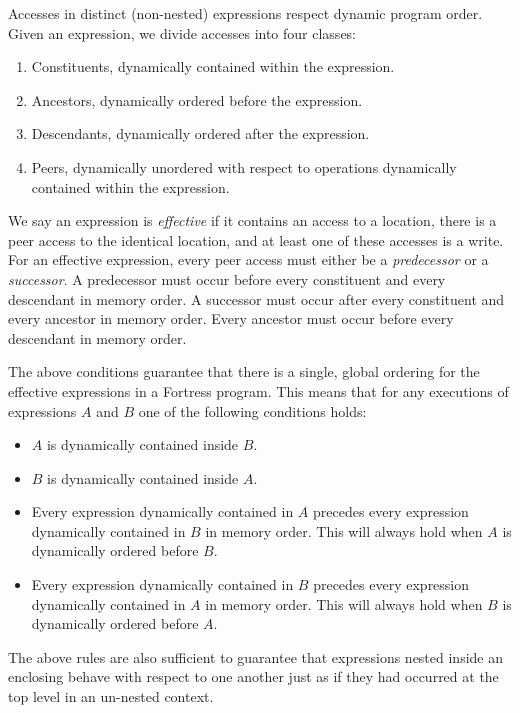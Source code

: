 Accesses in distinct (non-nested)  expressions respect
dynamic program order.  Given an  expression, we divide
accesses into four classes:
\begin{enumerate}
\item Constituents, dynamically contained within the  expression.
\item Ancestors, dynamically ordered before the  expression.
\item Descendants, dynamically ordered after the  expression.
\item Peers, dynamically unordered with respect to operations
  dynamically contained within the  expression.
\end{enumerate}
We say an  expression is \emph{effective} if it contains
an access to a location, there is a peer access to the identical
location, and at least one of these accesses is a write.  For an
effective  expression, every peer access must either be
a \emph{predecessor} or a \emph{successor}.  A predecessor must occur
before every constituent and every descendant in memory order.  A
successor must occur after every constituent and every ancestor in
memory order.  Every ancestor must occur before every descendant in
memory order.

The above conditions guarantee that there is a single, global ordering
for the effective  expressions in a Fortress program.  This
means that for any executions of  expressions $A$ and $B$ one of the
following conditions holds:
\begin{itemize}
\item $A$ is dynamically contained inside $B$.
\item $B$ is dynamically contained inside $A$.
\item Every expression dynamically contained in $A$ precedes every
  expression dynamically contained in $B$ in memory order.  This will
  always hold when $A$ is dynamically ordered before $B$.
\item Every expression dynamically contained in $B$ precedes every
  expression dynamically contained in $A$ in memory order.  This will
  always hold when $B$ is dynamically ordered before $A$.
\end{itemize}
The above rules are also sufficient to guarantee that 
expressions nested inside an enclosing  behave with
respect to one another just as if they had occurred at the top level
in an un-nested context.

